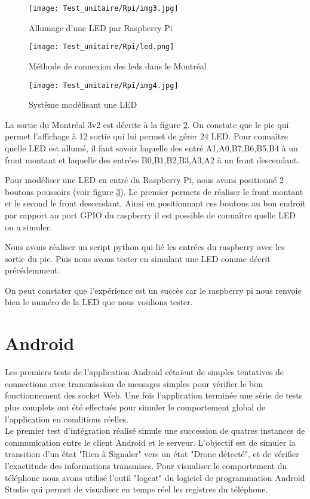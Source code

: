 \begin{figure}[!h]
  \texttt{[image: Test\_unitaire/Rpi/img3.jpg]}
  \caption{Allumage d'une LED par Raspberry Pi}
  \label{figure:led}
\end{figure}

\begin{figure}[!h]
  \centering
  \texttt{[image: Test\_unitaire/Rpi/led.png]}
  \caption{Méthode de connexion des leds dans le Montréal}  
  \label{figure:ledMontreal}
\end{figure}
\begin{figure}[!h]
  \centering
  \texttt{[image: Test\_unitaire/Rpi/img4.jpg]}  
  \caption{Système modélisant une LED}
  \label{figure:test}
\end{figure}

La sortie du Montréal 3v2 est décrite à la figure \ref{figure:ledMontreal}. On constate que le pic qui permet l'affichage à 12 sortie qui lui permet de gérer 24 LED. Pour connaître quelle LED est allumé, il faut savoir laquelle des entré A1,A0,B7,B6,B5,B4 à un front montant et laquelle des entrées B0,B1,B2,B3,A3,A2 à un front descendant.

Pour modéliser une LED en entré du Raspberry Pi, nous avons positionné 2 boutons poussoirs (voir figure \ref{figure:test}). Le premier permets de réaliser le front montant et le second le front descendant. Ainsi en positionnant ces boutons au bon endroit par rapport au port GPIO du raspberry il est possible de connaître quelle LED on a simuler.

Nous avons réaliser un script python qui lié les entrées du raspberry avec les sortie du pic. Puis nous avons tester en simulant une LED comme décrit précédemment.

On peut constater que l'expérience est un succès car le raspberry pi nous renvoie bien le numéro de la LED que nous voulions tester.


\section{Android}

Les premiers tests de l'application Android eétaient de simples tentatives de connections avec transmission de messages simples pour vérifier le bon fonctionnement des socket Web. 
Une fois l'application terminée une série de tests plus complets ont été effectués pour simuler le comportement global de l'application en conditions réelles.
~\\
Le premier test d'intégration réalisé simule une succession de quatres instances de communication entre le client Android et le serveur. L'objectif est de simuler la transition d'un état "Rien à Signaler" vers un état "Drone détecté", et de vérifier l'exactitude des informations transmises. Pour visualiser le comportement du téléphone nous avons utilisé l'outil "logcat" du logiciel de programmation Android Studio qui permet de visualiser en temps réel les registres du téléphone. 

